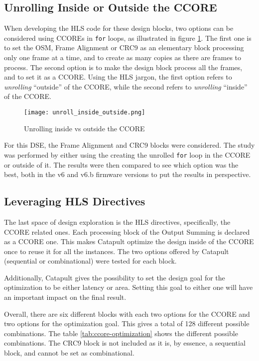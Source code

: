 \begin{itemize}
\subsection{Unrolling Inside or Outside the CCORE}

When developing the HLS code for these design blocks, two options can be considered using CCOREs in \verb|for| loops, as illustrated in figure \ref{fig:unrolling-inside-outside}. The first one is to set the OSM, Frame Alignment or CRC9 as an elementary block processing only one frame at a time, and to create as many copies as there are frames to process. The second option is to make the design block process all the frames, and to set it as a CCORE. Using the HLS jargon, the first option refers to \textit{unrolling} ``outside'' of the CCORE, while the second refers to \textit{unrolling} ``inside'' of the CCORE.

\begin{figure}
    \centering
    \texttt{[image: unroll\_inside\_outside.png]}
    \caption{Unrolling inside vs outside the CCORE}
    \label{fig:unrolling-inside-outside}
\end{figure}

For this DSE, the Frame Alignment and CRC9 blocks were considered. The study was performed by either using the creating the unrolled \verb|for| loop in the CCORE or outside of it. The results were then compared to see which option was the best, both in the v6 and v6.b firmware versions to put the results in perspective.

\subsection{Leveraging HLS Directives}

The last space of design exploration is the HLS directives, specifically, the CCORE related ones. Each processing block of the Output Summing is declared as a CCORE one. This makes Catapult optimize the design inside of the CCORE once to reuse it for all the instances. The two options offered by Catapult (sequential or combinational) were tested for each block.

Additionally, Catapult gives the possibility to set the design goal for the optimization to be either latency or area. Setting this goal to either one will have an important impact on the final result.

Overall, there are six different blocks with each two options for the CCORE and two options for the optimization goal. This gives a total of 128 different possible combinations. The table \ref{tab:ccore-optimization} shows the different possible combinations. The CRC9 block is not included as it is, by essence, a sequential block, and cannot be set as combinational.


\end{itemize}
